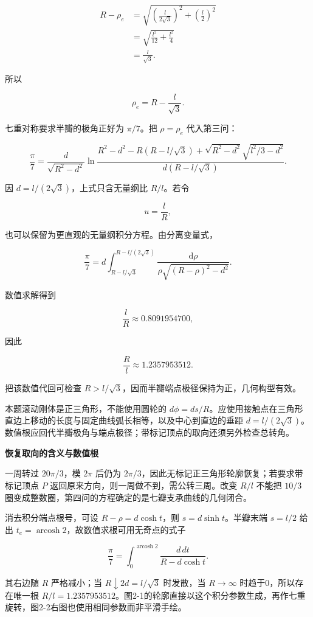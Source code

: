 \documentclass[12pt,a4paper,UTF8]{ctexart}
\begin{document}
\[\begin{aligned}
R-\rho_e
&=\sqrt{\left(\frac{l}{2\sqrt3}\right)^2+\left(\frac l2\right)^2}\\
&=\sqrt{\frac{l^2}{12}+\frac{l^2}{4}}\\
&=\frac{l}{\sqrt3}.
\end{aligned}\]

所以

\[\rho_e=R-\frac{l}{\sqrt3}.\]

七重对称要求半瓣的极角正好为 \(\pi/7\)。把 \(\rho=\rho_e\) 代入第三问：

\[\boxed{
\frac{\pi}{7}=
\frac{d}{\sqrt{R^2-d^2}}
\ln\frac{
R^2-d^2-R\left(R-l/\sqrt3\right)
+\sqrt{R^2-d^2}\sqrt{l^2/3-d^2}
}{d\left(R-l/\sqrt3\right)}
}.\]

因 \(d=l/(2\sqrt3)\)，上式只含无量纲比 \(R/l\)。若令

\[u=\frac{l}{R},\]

也可以保留为更直观的无量纲积分方程。由分离变量式，

\[\boxed{
\frac{\pi}{7}
=d\int_{R-l/\sqrt3}^{R-l/(2\sqrt3)}
\frac{\mathrm{d}\rho}{\rho\sqrt{(R-\rho)^2-d^2}}
}.\]

数值求解得到

\[\frac{l}{R}\approx0.8091954700,\]

因此

\[\boxed{\frac{R}{l}\approx1.2357953512}.\]

把该数值代回可检查
\(R>l/\sqrt3\)，因而半瓣端点极径保持为正，几何构型有效。

本题滚动刚体是正三角形，不能使用圆轮的
\(d\phi=ds/R\)。应使用接触点在三角形直边上移动的长度与固定曲线弧长相等，以及中心到直边的垂距
\(d=l/(2\sqrt3)\)。数值根应回代半瓣极角与端点极径；带标记顶点的取向还须另外检查总转角。

\textbf{恢复取向的含义与数值根}

一周转过 \(20\pi/3\)，模 \(2\pi\) 后仍为
\(2\pi/3\)，因此无标记正三角形轮廓恢复；若要求带标记顶点 \(P\)
返回原来方向，则一周做不到，需公转三周。改变 \(R/l\) 不能把 \(10/3\)
圈变成整数圈，第四问的方程确定的是七瓣支承曲线的几何闭合。

消去积分端点根号，可设 \(R-\rho=d\cosh t\)，则 \(s=d\sinh t\)。半瓣末端
\(s=l/2\) 给出
\(t_e=\operatorname{arcosh}2\)，故数值求根可用无奇点的式子

\[\frac\pi7=\int_0^{\operatorname{arcosh}2}
\frac{d\,dt}{R-d\cosh t}.\]

其右边随 \(R\) 严格减小；当 \(R\downarrow2d=l/\sqrt3\) 时发散，当
\(R\to\infty\) 时趋于0，所以存在唯一根
\(R/l=1.2357953512\)。图2-1的轮廓直接以这个积分参数生成，再作七重旋转，图2-2右图也使用相同参数而非平滑手绘。
\end{document}
